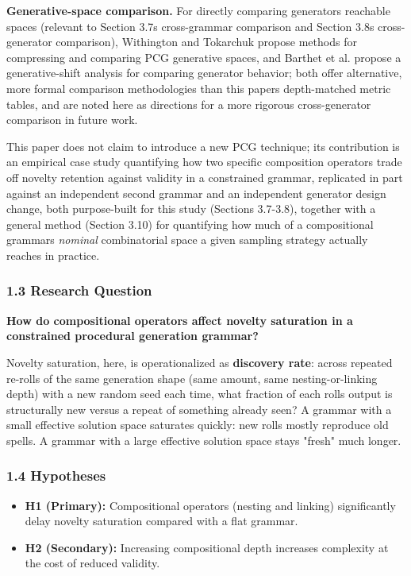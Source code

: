 \documentclass[
  10pt,
  twocolumn]{article}
\providecommand{\tightlist}{%
  \setlength{\itemsep}{0pt}\setlength{\parskip}{0pt}}
\begin{document}
\textbf{Generative-space comparison.} For directly comparing
generators\textquotesingle{} reachable spaces (relevant to Section
3.7\textquotesingle s cross-grammar comparison and Section
3.8\textquotesingle s cross-generator comparison), Withington and
Tokarchuk propose methods for compressing and comparing PCG generative
spaces, and Barthet et al. propose a generative-shift analysis for
comparing generator behavior; both offer alternative, more formal
comparison methodologies than this paper\textquotesingle s depth-matched
metric tables, and are noted here as directions for a more rigorous
cross-generator comparison in future work.

This paper does not claim to introduce a new PCG technique; its
contribution is an empirical case study quantifying how two specific
composition operators trade off novelty retention against validity in a
constrained grammar, replicated in part against an independent second
grammar and an independent generator design change, both purpose-built
for this study (Sections 3.7-3.8), together with a general method
(Section 3.10) for quantifying how much of a compositional
grammar\textquotesingle s \emph{nominal} combinatorial space a given
sampling strategy actually reaches in practice.

\subsubsection{1.3 Research Question}\label{13-research-question}

\textbf{How do compositional operators affect novelty saturation in a
constrained procedural generation grammar?}

Novelty saturation, here, is operationalized as \textbf{discovery rate}:
across repeated re-rolls of the same generation shape (same amount, same
nesting-or-linking depth) with a new random seed each time, what
fraction of each roll\textquotesingle s output is structurally new
versus a repeat of something already seen? A grammar with a small
effective solution space saturates quickly: new rolls mostly reproduce
old spells. A grammar with a large effective solution space stays
"fresh" much longer.

\subsubsection{1.4 Hypotheses}\label{14-hypotheses}

\begin{itemize}
\tightlist
\item
  \textbf{H1 (Primary):} Compositional operators (nesting and linking)
  significantly delay novelty saturation compared with a flat grammar.
\item
  \textbf{H2 (Secondary):} Increasing compositional depth increases
  complexity at the cost of reduced validity.
\end{itemize}
\end{document}

